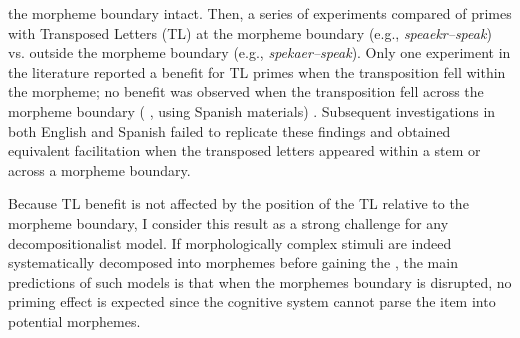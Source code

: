 \documentclass[output=paper]{langsci/langscibook}
\begin{document}
the morpheme boundary intact. Then, a series of experiments compared of
primes with Transposed Letters (TL) at the morpheme boundary (e.g.,
\emph{speaekr--speak}) vs. outside the morpheme boundary (e.g.,
\emph{spekaer--speak}). Only one experiment  in the literature
reported a benefit for TL primes when the transposition fell within the
morpheme; no benefit was observed when the transposition fell across the
morpheme boundary %
(%
\citealt{DunabeitiaPereaEtAl2007} %
, using Spanish materials)%
%
.
Subsequent investigations in both English and Spanish failed to
replicate these findings %
\citep{BeyersmannColtheartCastles2012,BeyersmannMcCormickRastle2013,RuecklRimzhim2011,Sanchez-GutierrezRastle2013} %
%
%
 and obtained equivalent facilitation
when the transposed letters appeared within a stem or across a morpheme
boundary.

Because TL benefit is not affected by the position of the TL relative to
the morpheme boundary, I consider this result as a strong challenge for
any decompositionalist model. If morphologically complex stimuli are
indeed systematically decomposed into morphemes before gaining the
, the main predictions of such models is that when the
morphemes boundary is disrupted, no priming effect is expected since the
cognitive system cannot parse the item into potential morphemes.
\end{document}
